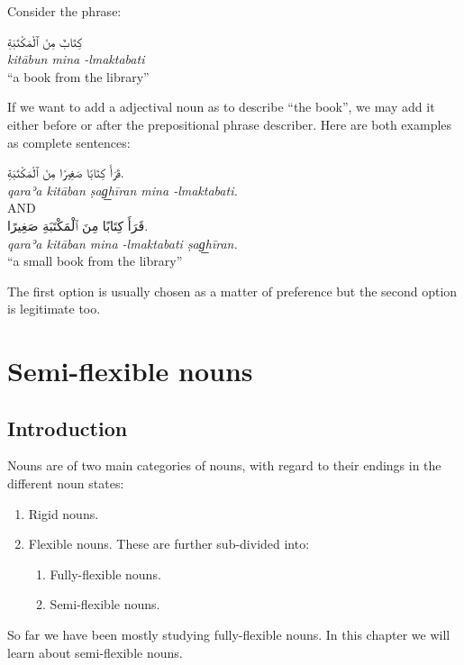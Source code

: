\documentclass[
  10pt,
]{book}
\providecommand{\tightlist}{%
  \setlength{\itemsep}{0pt}\setlength{\parskip}{0pt}}
\begin{document}
Consider the phrase:

\foreignlanguage{arabic}{کِتَابٌ مِنَ ٱلْمَکْتَبَةِ}\\
\emph{kitābun mina -lmaktabati}\\
\enquote{a book from the library}

If we want to add a adjectival noun as to describe \enquote{the book}, we may add it either before or after the prepositional phrase describer. Here are both examples as complete sentences:

\foreignlanguage{arabic}{قَرَأَ کِتَابًا صَغِيرًا مِنَ ٱلْمَکْتَبَةِ.}\\
\emph{qaraʾa kitāban ṣag͟hīran mina -lmaktabati.}\\
AND\\
\foreignlanguage{arabic}{قَرَأَ کِتَابًا مِنَ ٱلْمَکْتَبَةِ صَغِيرًا.}\\
\emph{qaraʾa kitāban mina -lmaktabati ṣag͟hīran.}\\
\enquote{a small book from the library}

The first option is usually chosen as a matter of preference but the second option is legitimate too.

\chapter{Semi-flexible nouns}\label{semi-flexible-nouns}

\section{Introduction}\label{introduction-6}

Nouns are of two main categories of nouns, with regard to their endings in the different noun states:

\begin{enumerate}
\def\labelenumi{\arabic{enumi}.}
\tightlist
\item
  Rigid nouns.
\item
  Flexible nouns. These are further sub-divided into:

  \begin{enumerate}
  \def\labelenumii{\roman{enumii}.}
  \tightlist
  \item
    Fully-flexible nouns.
  \item
    Semi-flexible nouns.
  \end{enumerate}
\end{enumerate}

So far we have been mostly studying fully-flexible nouns. In this chapter we will learn about semi-flexible nouns.
\end{document}
